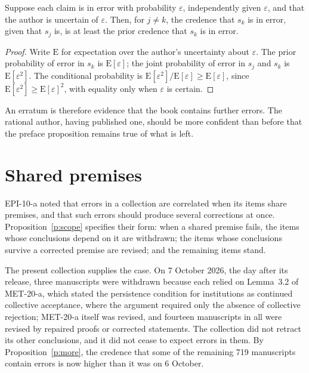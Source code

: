 \documentclass{situationist-preprint}
\begin{document}
\begin{proposition}\label{p:more}
Suppose each claim is in error with probability $\varepsilon$, independently given $\varepsilon$, and that the author is uncertain of $\varepsilon$. Then, for $j \neq k$, the credence that $s_k$ is in error, given that $s_j$ is, is at least the prior credence that $s_k$ is in error.
\end{proposition}

\begin{proof}
Write $\mathrm{E}$ for expectation over the author's uncertainty about $\varepsilon$. The prior probability of error in $s_k$ is $\mathrm{E}[\varepsilon]$; the joint probability of error in $s_j$ and $s_k$ is $\mathrm{E}[\varepsilon^2]$. The conditional probability is $\mathrm{E}[\varepsilon^2]/\mathrm{E}[\varepsilon] \geq \mathrm{E}[\varepsilon]$, since $\mathrm{E}[\varepsilon^2] \geq \mathrm{E}[\varepsilon]^2$, with equality only when $\varepsilon$ is certain.
\end{proof}

An erratum is therefore evidence that the book contains further errors. The rational author, having published one, should be more confident than before that the preface proposition remains true of what is left.

\section{Shared premises}

EPI-10-a noted that errors in a collection are correlated when its items share premises, and that such errors should produce several corrections at once. Proposition~\ref{p:scope} specifies their form: when a shared premise fails, the items whose conclusions depend on it are withdrawn; the items whose conclusions survive a corrected premise are revised; and the remaining items stand.

The present collection supplies the case. On 7 October 2026, the day after its release, three manuscripts were withdrawn because each relied on Lemma~3.2 of MET-20-a, which stated the persistence condition for institutions as continued collective acceptance, where the argument required only the absence of collective rejection; MET-20-a itself was revised, and fourteen manuscripts in all were revised by repaired proofs or corrected statements. The collection did not retract its other conclusions, and it did not cease to expect errors in them. By Proposition~\ref{p:more}, the credence that some of the remaining 719 manuscripts contain errors is now higher than it was on 6 October.
\end{document}

